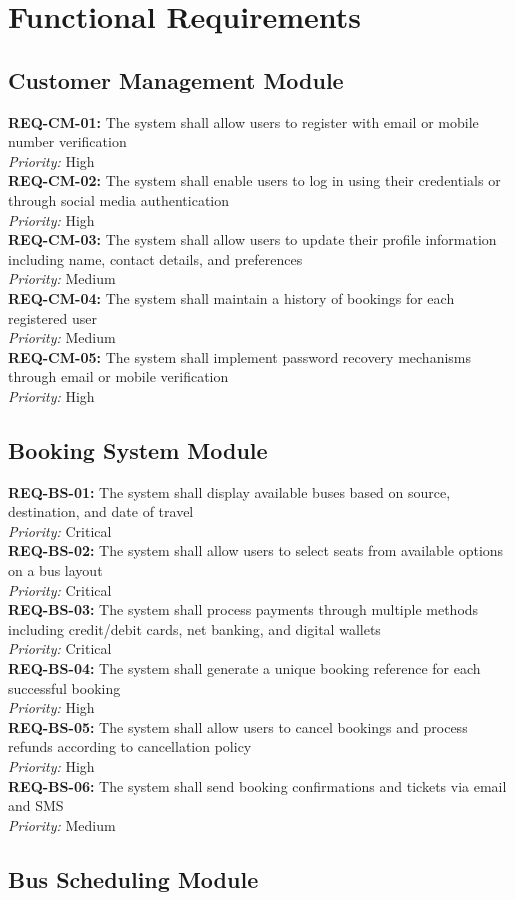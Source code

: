 \documentclass[12pt,a4paper]{report}
\newcommand{\requirement}[3]{
    \noindent\textbf{REQ-#1:} #2 \\
    \textit{Priority:} #3 \\
}
\begin{document}
\section{Functional Requirements}

\subsection{Customer Management Module}

\requirement{CM-01}{The system shall allow users to register with email or mobile number verification}{High}

\requirement{CM-02}{The system shall enable users to log in using their credentials or through social media authentication}{High}

\requirement{CM-03}{The system shall allow users to update their profile information including name, contact details, and preferences}{Medium}

\requirement{CM-04}{The system shall maintain a history of bookings for each registered user}{Medium}

\requirement{CM-05}{The system shall implement password recovery mechanisms through email or mobile verification}{High}

\subsection{Booking System Module}

\requirement{BS-01}{The system shall display available buses based on source, destination, and date of travel}{Critical}

\requirement{BS-02}{The system shall allow users to select seats from available options on a bus layout}{Critical}

\requirement{BS-03}{The system shall process payments through multiple methods including credit/debit cards, net banking, and digital wallets}{Critical}

\requirement{BS-04}{The system shall generate a unique booking reference for each successful booking}{High}

\requirement{BS-05}{The system shall allow users to cancel bookings and process refunds according to cancellation policy}{High}

\requirement{BS-06}{The system shall send booking confirmations and tickets via email and SMS}{Medium}

\subsection{Bus Scheduling Module}
\end{document}
